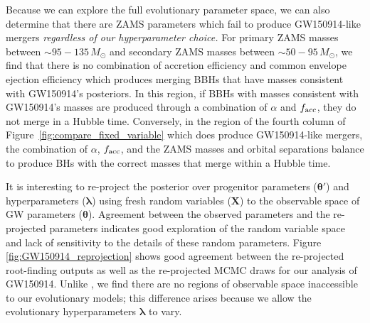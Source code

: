 \documentclass[twocolumn]{aastex631}
\begin{document}
Because we can explore the full evolutionary parameter space, we can also
determine that there are ZAMS parameters which fail to produce GW150914-like
mergers \emph{regardless of our hyperparameter choice.} For primary ZAMS masses
between $\sim95-135\,M_{\odot}$ and secondary ZAMS masses between
$\sim50-95\,M_{\odot}$, we find that there is no combination of accretion
efficiency and common envelope ejection efficiency which produces merging BBHs
that have masses consistent with GW150914's posteriors. In this region, if BBHs
with masses consistent with GW150914's masses are produced through a combination
of $\alpha$ and $f_{\rm{acc}}$, they do not merge in a Hubble time. Conversely,
in the region of the fourth column of Figure~\ref{fig:compare_fixed_variable}
which does produce GW150914-like mergers, the combination of $\alpha$,
$f_{\rm{acc}}$, and the ZAMS masses and orbital separations balance to produce
BHs with the correct masses that merge within a Hubble time.



It is interesting to re-project the posterior over progenitor parameters
($\bm{\theta}'$) and hyperparameters ($\bm{\lambda}$) using fresh random
variables ($\bm{X}$) to the observable space of GW parameters ($\bm{\theta}$).
Agreement between the observed parameters and the re-projected parameters
indicates good exploration of the random variable space and lack of sensitivity
to the details of these random parameters.  Figure
\ref{fig:GW150914_reprojection} shows good agreement between the re-projected
root-finding outputs as well as the re-projected MCMC draws for our analysis of
GW150914.  Unlike \citet{Andrews2021}, we find there are no regions of
observable space inaccessible to our evolutionary models; this difference arises
because we allow the evolutionary hyperparameters $\bm{\lambda}$ to vary.

\end{document}
